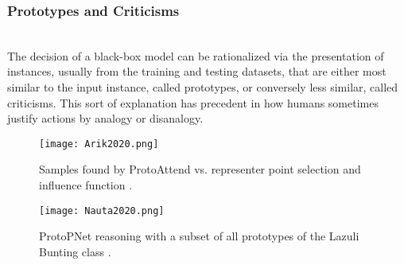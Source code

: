 \documentclass[journal]{IEEEtran}
\begin{document}
\subsubsection{Prototypes and Criticisms}
\hfill\\
The decision of a black-box model can be rationalized via the presentation of instances, usually from the training and testing datasets, that are either most similar to the input instance, called prototypes, or conversely less similar, called criticisms. This sort of explanation has precedent in how humans sometimes justify actions by analogy or disanalogy. \cite{Caruana1999}

\begin{figure}[h!]
  \texttt{[image: Arik2020.png]}
  \caption{Samples found by ProtoAttend vs. representer point selection and influence function \cite{Arik2020}.}
\end{figure}

\begin{figure}
  \texttt{[image: Nauta2020.png]}
  \caption{ProtoPNet reasoning with a subset of all prototypes of the Lazuli Bunting class \cite{Nauta2020}.}
\end{figure}
\end{document}

